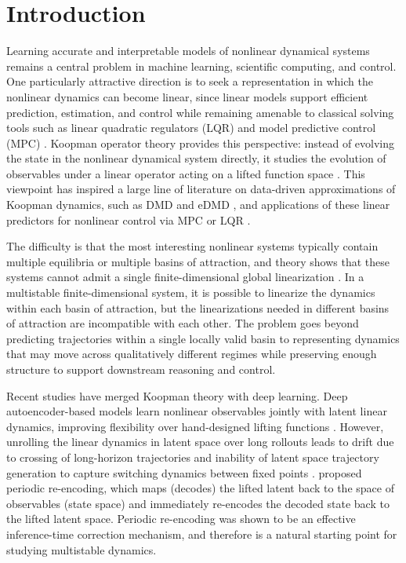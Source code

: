 \section{Introduction}
\label{sec:introduction}

Learning accurate and interpretable models of nonlinear dynamical systems remains a central problem in machine learning, scientific computing, and control. One particularly attractive direction is to seek a representation in which the nonlinear dynamics can become linear, since linear models support efficient prediction, estimation, and control while remaining amenable to classical solving tools such as linear quadratic regulators (LQR) \citep{kalman_general_1960} and model predictive control (MPC) \citep{mayne_constrained_2000, grune_nonlinear_2017}. Koopman operator theory provides this perspective: instead of evolving the state in the nonlinear dynamical system directly, it studies the evolution of observables under a linear operator acting on a lifted function space \citep{koopman_hamiltonian_1931, koopman_dynamical_1932, brunton_modern_2022}. This viewpoint has inspired a large line of literature on data-driven approximations of Koopman dynamics, such as DMD and eDMD \citep{schmid_dmd_2010, williams_datadriven_2015, williams_kernel-based_2016}, and applications of these linear predictors for nonlinear control via MPC \citep{korda_linear_2018} or LQR \citep{mamakoukas_local_2019}.

The difficulty is that the most interesting nonlinear systems typically contain multiple equilibria or multiple basins of attraction, and theory shows that these systems cannot admit a single finite-dimensional global linearization \citep{lan_linearization_2013, brunton_koopman_2016}. 
In a multistable finite-dimensional system, it is possible to linearize the dynamics within each basin of attraction, but the linearizations needed in different basins of attraction are incompatible with each other. The problem goes beyond predicting trajectories within a single locally valid basin to representing dynamics that may move across qualitatively different regimes while preserving enough structure to support downstream reasoning and control.

Recent studies have merged Koopman theory with deep learning. Deep autoencoder-based models learn nonlinear observables jointly with latent linear dynamics, improving flexibility over hand-designed lifting functions \citep{lusch_deep_2018, azencot_forecasting_2020, shi_deep_2022}. However, unrolling the linear dynamics in latent space over long rollouts leads to drift due to crossing of long-horizon trajectories and inability of latent space trajectory generation to capture switching dynamics between fixed points \citep{fathi_course_2023}. \citet{fathi_course_2023} proposed periodic re-encoding, which maps (decodes) the lifted latent back to the space of observables (state space) and immediately re-encodes the decoded state back to the lifted latent space. Periodic re-encoding was shown to be an effective inference-time correction mechanism, and therefore is a natural starting point for studying multistable dynamics.

